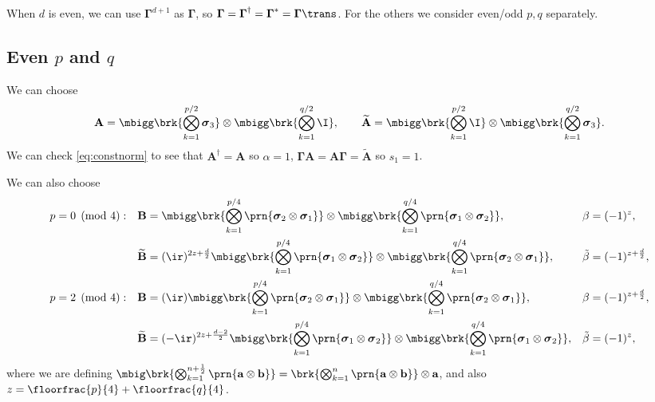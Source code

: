 \documentclass[11pt]{article}
\newcommand{\Gammab}{\boldsymbol{\Gamma}}
\newcommand{\A}{\mathbf{A}}
\newcommand{\B}{\mathbf{B}}
\newcommand{\At}{\widetilde{\A}}
\newcommand{\Bt}{\widetilde{\B}}
\newcommand{\sigmab}{\boldsymbol{\sigma}}
\newcommand{\betat}{\tilde{\beta}}
\begin{document}
When $d$ is even, we can use $\Gammab^{d+1}$ as $\Gammab$, so $\Gammab = \Gammab^\dag = \Gammab^\ast =\Gammab\trans$.
For the others we consider even/odd $p,q$ separately.


\subsection{Even \texorpdfstring{$p$ and $q$}{p and q}}\label{sec:eveneven}

We can choose
%
\begin{equation*}
  \A = \mbigg\brk{\bigotimes_{k=1}^{p/2} \sigmab_3}
        \otimes \mbigg\brk{\bigotimes_{k=1}^{q/2} \I},
  \qquad
  \At = \mbigg\brk{\bigotimes_{k=1}^{p/2} \I}
        \otimes \mbigg\brk{\bigotimes_{k=1}^{q/2} \sigmab_3}.
\end{equation*}
%
We can check \cref{eq:constnorm} to see that $\A^\dag = \A$ so $\alpha=1$, $\Gammab \A = \A \Gammab = \At$ so $s_1 = 1$.

We can also choose
%
\begin{equation*}
\begin{aligned}
  p &= 0 \pmod 4: &
  \B &= \mbigg\brk{\bigotimes_{k=1}^{p/4} \prn{\sigmab_2 \otimes \sigmab_1}} \otimes
        \mbigg\brk{\bigotimes_{k=1}^{q/4} \prn{\sigmab_1 \otimes \sigmab_2}}, &
  \beta &= (-1)^{z}, \\ &&
  \Bt &= (\ir)^{2z + \frac{d}{2}}
        \mbigg\brk{\bigotimes_{k=1}^{p/4} \prn{\sigmab_1 \otimes \sigmab_2}} \otimes
        \mbigg\brk{\bigotimes_{k=1}^{q/4} \prn{\sigmab_2 \otimes \sigmab_1}}, &
  \betat &= (-1)^{z+\frac{d}{2}}, \\
  p &= 2 \pmod 4: &
  \B &= (\ir)
        \mbigg\brk{\bigotimes_{k=1}^{p/4} \prn{\sigmab_2 \otimes \sigmab_1}} \otimes
        \mbigg\brk{\bigotimes_{k=1}^{q/4} \prn{\sigmab_2 \otimes \sigmab_1}}, &
  \beta &= (-1)^{z + \frac{d}{2}}, \\ &&
  \Bt &= (-\ir)^{2z + \frac{d-2}{2}}
        \mbigg\brk{\bigotimes_{k=1}^{p/4} \prn{\sigmab_1 \otimes \sigmab_2}} \otimes
        \mbigg\brk{\bigotimes_{k=1}^{q/4} \prn{\sigmab_1 \otimes \sigmab_2}}, &
  \betat &= (-1)^{z}, 
      \end{aligned}
\end{equation*}
%
where we are defining \( \mbig\brk{\bigotimes_{k=1}^{n+\frac{1}{2}} \prn{\mathbf{a} \otimes \mathbf{b}}}
= \brk{\bigotimes_{k=1}^{n} \prn{\mathbf{a} \otimes \mathbf{b}}} \otimes \mathbf{a} \),
and also $z = \floorfrac{p}{4} + \floorfrac{q}{4}$.
\end{document}
